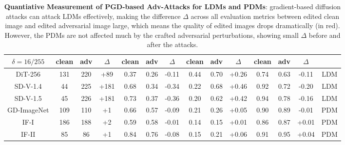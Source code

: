 \begin{table}[t]
{\begin{tabular}{c|ccc|ccc|ccc|ccc|c}
\midrule
  $\delta=16/255$ & clean & adv & $\Delta$  & clean & adv & $\Delta$  & clean & adv & $\Delta$ & clean & adv & $\Delta$ &   \\  

  \midrule
DiT-256 & 131 & 220  & {\color{red}+89}  & 0.37 & 0.26 & {\color{red}-0.11} & 0.44 & 0.70 & {\color{red}+0.26} & 0.74 & 0.63 & {\color{red}-0.11} & LDM  \\
SD-V-1.4 & 44 & 225  & {\color{red}+181}  & 0.68 & 0.34 & {\color{red}-0.34}  & 0.22 & 0.68 & {\color{red}+0.46}  & 0.92 & 0.72 & {\color{red}-0.20}  & LDM  \\
SD-V-1.5 & 45 & 226  & {\color{red}+181}  & 0.73 & 0.37 & {\color{red}-0.36} & 0.20 & 0.62 & {\color{red}+0.42} & 0.94 & 0.78 & {\color{red}-0.16} & LDM  \\
GD-ImageNet & 109 & 110  & +1  & 0.66 & 0.57 & -0.09 & 0.21 & 0.26 & +0.05 & 0.90 & 0.89 & -0.01 & PDM  \\
IF-I & 186 & 188  & +2  & 0.59 & 0.58 & -0.01 & 0.14 & 0.15 & +0.01 & 0.86 & 0.87 & +0.01 & PDM  \\
IF-II &85 & 86  & +1  & 0.84 & 0.76 & -0.08 & 0.15 & 0.21 & +0.06 & 0.91 & 0.95 & +0.04 & PDM   \\


\bottomrule
  \end{tabular}
}
\vspace{10pt}
 \caption{
  \textbf{Quantiative Measurement of PGD-based Adv-Attacks for LDMs and PDMs}: gradient-based diffusion attacks can attack LDMs effectively, making the difference $\Delta$ across all evaluation metrics between edited clean image and edited adversarial image large, which means the quality of edited images drops dramatically (in red). However, the PDMs are not affected much by the crafted adversarial perturbations, showing small $\Delta$ before and after the attacks.
  }
  \label{quant_protect}
  \vspace{-20pt}
\end{table}